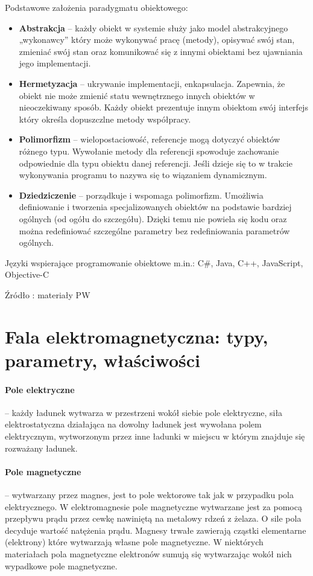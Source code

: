\documentclass[a4paper,twoside]{report}
\begin{document}
Podstawowe założenia paradygmatu obiektowego:
\begin{itemize}
\item \textbf{Abstrakcja} – każdy obiekt w systemie służy jako model abstrakcyjnego „wykonawcy” który może wykonywać pracę (metody), opisywać swój stan, zmieniać swój stan oraz komunikować się z innymi obiektami bez ujawniania jego implementacji.
\item \textbf{Hermetyzacja} – ukrywanie implementacji, enkapsulacja. Zapewnia, że obiekt nie może zmienić statu wewnętrznego innych obiektów w nieoczekiwany sposób. Każdy obiekt prezentuje innym obiektom swój interfejs który określa dopuszczlne metody współpracy.
\item \textbf{Polimorfizm} – wielopostaciowość, referencje mogą dotyczyć obiektów różnego typu. Wywołanie metody dla referencji spowoduje zachowanie odpowiednie dla typu obiektu danej referencji. Jeśli dzieje się to w trakcie wykonywania programu to nazywa się to wiązaniem dynamicznym.
\item \textbf{Dziedziczenie} – porządkuje i wspomaga polimorfizm. Umożliwia definiowanie i tworzenia specjalizowanych obiektów na podstawie bardziej ogólnych (od ogółu do szczegółu). Dzięki temu nie powiela się kodu oraz można redefiniować szczególne parametry bez redefiniowania parametrów ogólnych.
\end{itemize}
\medskip 

Języki wspierające programowanie obiektowe m.in.: C\#, Java, C++, JavaScript, Objective-C
\medskip 

Źródło : materiały PW


\section{Fala elektromagnetyczna: typy, parametry, właściwości}
\paragraph{Pole elektryczne} – każdy ładunek wytwarza w przestrzeni wokół siebie pole elektryczne, siła elektrostatyczna działająca na dowolny ładunek jest wywołana polem elektrycznym, wytworzonym przez inne ładunki w miejscu w którym znajduje się rozważany ładunek.

\paragraph{Pole magnetyczne} – wytwarzany przez magnes, jest to pole wektorowe tak jak w przypadku pola elektrycznego. W elektromagnesie pole magnetyczne wytwarzane jest za pomocą przepływu prądu przez cewkę nawiniętą na metalowy rdzeń z żelaza. O sile pola decyduje wartość natężenia prądu. Magnesy trwałe zawierają cząstki elementarne (elektrony) które wytwarzają własne pole magnetyczne. W niektórych materiałach pola magnetyczne elektronów sumują się wytwarzając wokół nich wypadkowe pole magnetyczne.
\end{document}
